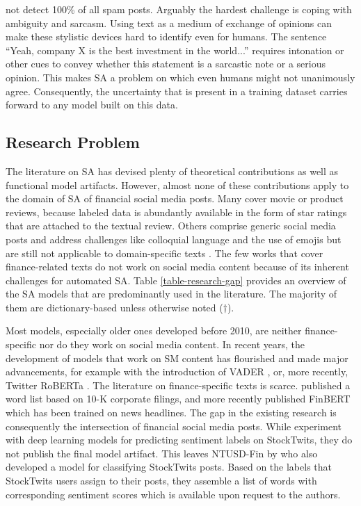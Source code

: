 not detect 100\% of all spam posts. Arguably the hardest challenge is coping with ambiguity and sarcasm. Using text as a medium of exchange of opinions can make these stylistic devices hard to identify even for humans. The sentence ``Yeah, company X is the best investment in the world...'' requires intonation or other cues to convey whether this statement is a sarcastic note or a serious opinion. This makes SA a problem on which even humans might not unanimously agree. Consequently, the uncertainty that is present in a training dataset carries forward to any model built on this data.







\subsection{Research Problem}
\label{section-research-gap}
The literature on SA has devised plenty of theoretical contributions as well as functional model artifacts. However, almost none of these contributions apply to the domain of SA of financial social media posts. Many cover movie or product reviews, because labeled data is abundantly available in the form of star ratings that are attached to the textual review. Others comprise generic social media posts and address challenges like colloquial language and the use of emojis but are still not applicable to domain-specific texts . The few works that cover finance-related texts \cite{loughranMcD2011, araci2019finbert}  do not work on social media content because of its inherent challenges for automated SA. Table \ref{table-research-gap} provides an overview of the SA models that are predominantly used in the literature. The majority of them are dictionary-based unless otherwise noted ($\dagger$).



Most models, especially older ones developed before 2010, are neither finance-specific nor do they work on social media content. In recent years, the development of models that work on SM content has flourished and made major advancements, for example with the introduction of VADER , or, more recently, Twitter RoBERTa . The literature on finance-specific texts is scarce.  published a word list based on 10-K corporate filings, and more recently  published FinBERT which has been trained on news headlines. The gap in the existing research is consequently the intersection of financial social media posts. While  experiment with deep learning models for predicting sentiment labels on StockTwits, they do not publish the final model artifact. This leaves NTUSD-Fin by  who also developed a model for classifying StockTwits posts. Based on the labels that StockTwits users assign to their posts, they assemble a list of words with corresponding sentiment scores which is available upon request to the authors.

